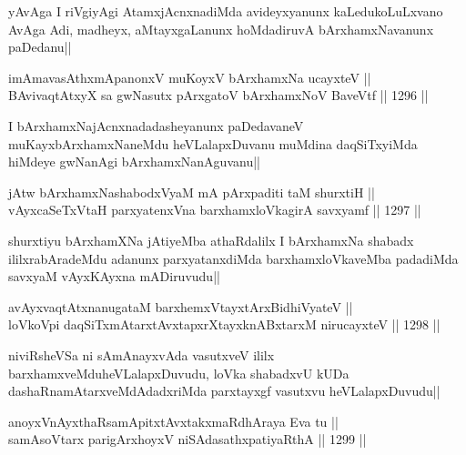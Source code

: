 \begin{artha}
yAvAga I riVgiyAgi AtamxjAcnxnadiMda avideyxyanunx kaLedukoLuLxvano AvAga Adi, madheyx, aMtayxgaLanunx hoMdadiruvA bArxhamxNavanunx paDedanu||
\end{artha}

\begin{shl}
imAmavasAthxmApanonxV muKoyxV bArxhamxNa ucayxteV || \\
BAvivaqtAtxyX sa gwNasutx pArxgatoV bArxhamxNoV BaveVtf ||  1296 ||  
\end{shl}

\begin{artha}
I bArxhamxNajAcnxnadadasheyanunx paDedavaneV muKayxbArxhamxNaneMdu heVLalapxDuvanu muMdina daqSiTxyiMda hiMdeye gwNanAgi bArxhamxNanAguvanu||
\end{artha}


\begin{shl}
jAtw bArxhamxNashabodxV\s yaM mA pArxpaditi taM shurxtiH || \\
vAyxcaSeTxV\s taH parxyatenxVna barxhamxloVkagirA savxyamf ||  1297 ||  
\end{shl}

\begin{artha}
shurxtiyu bArxhamXNa jAtiyeMba athaRdalilx I bArxhamxNa shabadx ililxrabAradeMdu adanunx parxyatanxdiMda barxhamxloVkaveMba padadiMda savxyaM vAyxKAyxna mADiruvudu||
\end{artha}


\begin{shl}
avAyxvaqtAtxnanugataM barxhemxVtayxtArxBidhiVyateV || \\
loVkoV\s pi daqSiTxmAtarxtAvxtapxrXtayxknABxtarxM nirucayxteV ||  1298 ||  
\end{shl}

\begin{artha}
niviRsheVSa ni sAmAnayxvAda vasutxveV ililx barxhamxveMduheVLalapxDuvudu, loVka shabadxvU kUDa dashaRnamAtarxveMdAdadxriMda parxtayxgf vasutxvu heVLalapxDuvudu||
\end{artha}


\begin{shl}
anoyxVnAyxthaRsamApitxtAvxtakxmaRdhAraya Eva tu || \\
samAsoV\s tarx parigArxhoyxV niSAdasathxpatiyaRthA ||  1299 ||  
\end{shl}

